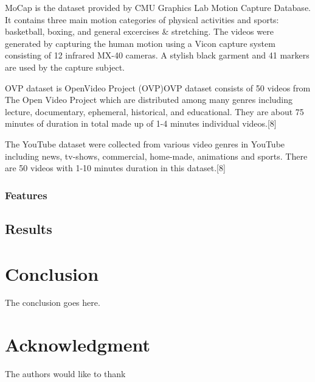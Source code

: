 \documentclass[conference]{IEEEtran}
\begin{document}


MoCap is the dataset provided by CMU Graphics Lab Motion Capture Database. It contains three main motion categories of physical activities and sports: basketball, boxing, and general excercises \& stretching. The videos were generated by capturing the human motion using a Vicon capture system consisting of 12 infrared MX-40 cameras. A stylish black garment and 41 markers are used by the capture subject.

OVP dataset is OpenVideo Project (OVP)OVP dataset consists of 50 videos from The Open Video Project which are distributed among many genres including lecture, documentary, ephemeral, historical, and educational. They are about 75 minutes of duration in total made up of 1-4 minutes individual videos.[8]

The YouTube dataset were collected from various video genres in YouTube including news, tv-shows, commercial, home-made, animations and sports. There are 50 videos with 1-10 minutes duration in this dataset.[8]

\subsubsection{Features}

\subsection{Results}

\section{Conclusion}
The conclusion goes here.


\newpage

\section*{Acknowledgment}

The authors would like to thank








\end{document}
